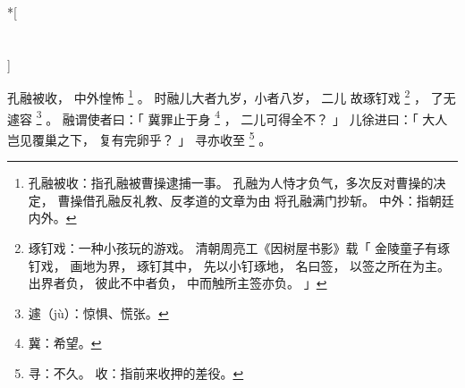 
\switchcolumn[0]*[\section{}]

孔融被收，
中外惶怖%
\footnote{%
    孔融被收：指孔融被曹操逮捕一事。
              孔融为人恃才负气，多次反对曹操的决定，
              曹操借孔融反礼教、反孝道的文章为由
              将孔融满门抄斩。
    中外：指朝廷内外。
}%
。
时融儿大者九岁，小者八岁，
二儿
故琢钉戏%
\footnote{%
    琢钉戏：一种小孩玩的游戏。
            清朝周亮工《因树屋书影》载「
                金陵童子有琢钉戏，
                画地为界，
                琢钉其中，
                先以小钉琢地，
                名曰签，
                以签之所在为主。
                出界者负，
                彼此不中者负，
                中而触所主签亦负。
            」
}%
，
了无遽容%
\footnote{%
    遽（jù）：惊惧、慌张。
}%
。
融谓使者曰：「
    冀罪止于身%
    \footnote{%
        冀：希望。
    }%
    ，
    二儿可得全不？
」
儿徐进曰：「
    大人岂见覆巢之下，
    复有完卵乎？
」
寻亦收至%
\footnote{%
    寻：不久。
    收：指前来收押的差役。
}%
。

\switchcolumn



